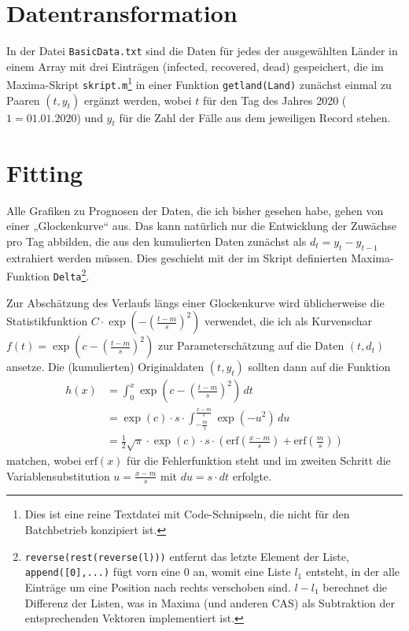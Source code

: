 \documentclass[a4paper,11pt]{article}
\newcommand{\br}[1]{\left(#1\right)}
\newcommand{\erf}{\mathrm{erf}}
\newcommand{\m}{\cdot}
\begin{document}
\section{Datentransformation}

In der Datei \texttt{BasicData.txt} sind die Daten für jedes der ausgewählten
Länder in einem Array mit drei Einträgen (infected, recovered, dead)
gespeichert, die im Maxima-Skript \texttt{skript.m}\footnote{Dies ist eine
  reine Textdatei mit Code-Schnipseln, die nicht für den Batchbetrieb
  konzipiert ist.} in einer Funktion \texttt{getland(Land)} zunächst einmal zu
Paaren $(t,y_t)$ ergänzt werden, wobei $t$ für den Tag des Jahres 2020 
($1=01.01.2020$) und $y_t$ für die Zahl der Fälle aus dem jeweiligen Record
stehen.

\section{Fitting}

Alle Grafiken zu Prognosen der Daten, die ich bisher gesehen habe, gehen von
einer „Glockenkurve“ aus.  Das kann natürlich nur die Entwicklung der Zuwächse
pro Tag abbilden, die aus den kumulierten Daten zunächst als $d_t=y_t-y_{t-1}$
extrahiert werden müssen. Dies geschieht mit der im Skript definierten
Maxima-Funktion \texttt{Delta}\footnote{\texttt{reverse(rest(reverse(l)))}
  entfernt das letzte Element der Liste, \texttt{append([0],...)} fügt vorn
  eine $0$ an, womit eine Liste $l_1$ entsteht, in der alle Einträge um eine
  Position nach rechts verschoben sind. $l-l_1$ berechnet die Differenz der
  Listen, was in Maxima (und anderen CAS) als Subtraktion der entsprechenden
  Vektoren implementiert ist.}.

Zur Abschätzung des Verlaufs längs einer Glockenkurve wird üblicherweise die
Statistikfunktion $C\m\exp\br{-\br{\frac{t-m}{s}}^2}$ verwendet, die ich als
Kurvenschar $f(t)=\exp\br{c-\br{\frac{t-m}{s}}^2}$ zur Parameterschätzung auf
die Daten $(t,d_t)$ ansetze.  Die (kumulierten) Originaldaten $(t,y_t)$
sollten dann auf die Funktion
\begin{align*}
  h(x)&=\int_0^x{\exp\br{c-\br{\frac{t-m}{s}}^2}}\,dt\\ &=\exp(c)\m s\m
  \int_{-\frac{m}{s}}^{\frac{x-m}{s}}{\exp\br{-u^2}}\,du\\ &=\frac12 \sqrt{\pi}\m
  \exp(c)\m s\m \br{\erf\br{\frac{x-m}{s}}+ \erf\br{\frac{m}{s}}}
\end{align*}
matchen, wobei $\erf(x)$ für die Fehlerfunktion steht und im zweiten Schritt
die Variablensubstitution $u=\frac{x-m}{s}$ mit $du=s\m dt$ erfolgte.
\end{document}
